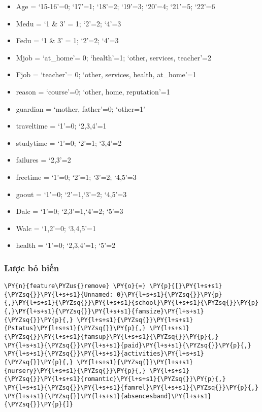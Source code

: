     \begin{itemize}
\tightlist
\item
  Age = `15-16'=0; `17'=1; `18'=2; `19'=3; `20'=4; `21'=5; `22'=6
\item
  Medu = `1 \& 3' = 1; `2'=2; `4'=3
\item
  Fedu = `1 \& 3' = 1; `2'=2; `4'=3
\item
  Mjob = `at\_home'= 0; `health'=1; `other, services, teacher'=2
\item
  Fjob = `teacher'= 0; `other, services, health, at\_home'=1
\item
  reason = `course'=0; `other, home, reputation'=1
\item
  guardian = `mother, father'=0; `other=1'
\item
  traveltime = `1'=0; `2,3,4'=1
\item
  studytime = `1'=0; `2'=1; `3,4'=2
\item
  failures = `2,3'=2
\item
  freetime = `1'=0; `2'=1; `3'=2; `4,5'=3
\item
  goout = `1'=0; `2'=1,`3'=2; `4,5'=3
\item
  Dalc = `1'=0; `2,3'=1,`4'=2; `5'=3
\item
  Walc = `1,2'=0; `3,4,5'=1
\item
  health = `1'=0; `2,3,4'=1; `5'=2
\end{itemize}

    \hypertarget{lux1b0ux1ee3c-bux1ecf-biux1ebfn}{%
\subsubsection{Lược bỏ biến}\label{lux1b0ux1ee3c-bux1ecf-biux1ebfn}}

    \begin{tcolorbox}[breakable, size=fbox, boxrule=1pt, pad at break*=1mm,colback=cellbackground, colframe=cellborder]
\begin{Verbatim}[commandchars=\\\{\}]
\PY{n}{feature\PYZus{}remove} \PY{o}{=} \PY{p}{[}\PY{l+s+s1}{\PYZsq{}}\PY{l+s+s1}{Unnamed: 0}\PY{l+s+s1}{\PYZsq{}}\PY{p}{,}\PY{l+s+s1}{\PYZsq{}}\PY{l+s+s1}{school}\PY{l+s+s1}{\PYZsq{}}\PY{p}{,}\PY{l+s+s1}{\PYZsq{}}\PY{l+s+s1}{famsize}\PY{l+s+s1}{\PYZsq{}}\PY{p}{,} \PY{l+s+s1}{\PYZsq{}}\PY{l+s+s1}{Pstatus}\PY{l+s+s1}{\PYZsq{}}\PY{p}{,} \PY{l+s+s1}{\PYZsq{}}\PY{l+s+s1}{famsup}\PY{l+s+s1}{\PYZsq{}}\PY{p}{,} \PY{l+s+s1}{\PYZsq{}}\PY{l+s+s1}{paid}\PY{l+s+s1}{\PYZsq{}}\PY{p}{,} \PY{l+s+s1}{\PYZsq{}}\PY{l+s+s1}{activities}\PY{l+s+s1}{\PYZsq{}}\PY{p}{,} \PY{l+s+s1}{\PYZsq{}}\PY{l+s+s1}{nursery}\PY{l+s+s1}{\PYZsq{}}\PY{p}{,} \PY{l+s+s1}{\PYZsq{}}\PY{l+s+s1}{romantic}\PY{l+s+s1}{\PYZsq{}}\PY{p}{,} \PY{l+s+s1}{\PYZsq{}}\PY{l+s+s1}{famrel}\PY{l+s+s1}{\PYZsq{}}\PY{p}{,} \PY{l+s+s1}{\PYZsq{}}\PY{l+s+s1}{absencesband}\PY{l+s+s1}{\PYZsq{}}\PY{p}{]}
\end{Verbatim}
\end{tcolorbox}

